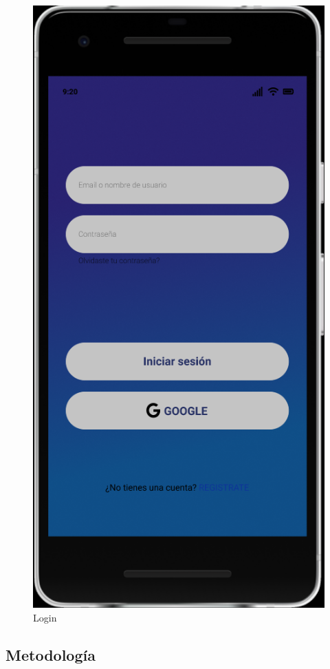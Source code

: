 \documentclass{article}
\begin{document}
\begin{figure}[H]
    \centering
    \includegraphics[scale=0.9]{imgs/Figma/Login}
    \caption{Login}
\end{figure}

\subsection{Metodología}
\pagebreak
\end{document}
